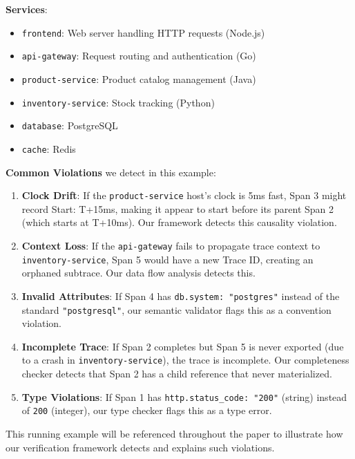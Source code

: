 \textbf{Services}:
\begin{itemize}
\item \texttt{frontend}: Web server handling HTTP requests (Node.js)
\item \texttt{api-gateway}: Request routing and authentication (Go)
\item \texttt{product-service}: Product catalog management (Java)
\item \texttt{inventory-service}: Stock tracking (Python)
\item \texttt{database}: PostgreSQL
\item \texttt{cache}: Redis
\end{itemize}

\textbf{Common Violations} we detect in this example:
\begin{enumerate}
\item \textbf{Clock Drift}: If the \texttt{product-service} host's clock is 5ms fast, Span 3 might record Start: T+15ms, making it appear to start before its parent Span 2 (which starts at T+10ms). Our framework detects this causality violation.

\item \textbf{Context Loss}: If the \texttt{api-gateway} fails to propagate trace context to \texttt{inventory-service}, Span 5 would have a new Trace ID, creating an orphaned subtrace. Our data flow analysis detects this.

\item \textbf{Invalid Attributes}: If Span 4 has \texttt{db.system: "postgres"} instead of the standard \texttt{"postgresql"}, our semantic validator flags this as a convention violation.

\item \textbf{Incomplete Trace}: If Span 2 completes but Span 5 is never exported (due to a crash in \texttt{inventory-service}), the trace is incomplete. Our completeness checker detects that Span 2 has a child reference that never materialized.

\item \textbf{Type Violations}: If Span 1 has \texttt{http.status\_code: "200"} (string) instead of \texttt{200} (integer), our type checker flags this as a type error.
\end{enumerate}

This running example will be referenced throughout the paper to illustrate how our verification framework detects and explains such violations.
